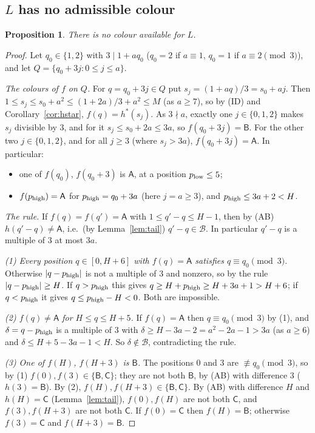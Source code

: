 \documentclass[11pt]{amsart}
\newtheorem{proposition}[theorem]{Proposition}
\theoremstyle{definition}
\theoremstyle{remark}
\newcommand{\cA}{\mathsf{A}}\newcommand{\cB}{\mathsf{B}}\newcommand{\cC}{\mathsf{C}}
\newcommand{\Bset}{\mathcal B}
\begin{document}
\subsection{$L$ has no admissible colour}
\begin{proposition}\label{prop:L}
There is no colour available for $L$.
\end{proposition}
\begin{proof}
Let $q_0\in\{1,2\}$ with $3\mid1+aq_0$ ($q_0=2$ if $a\equiv1$, $q_0=1$ if $a\equiv2\pmod 3$), and let
$Q=\{q_0+3j:0\le j\le a\}$.

\emph{The colours of $f$ on $Q$.} For $q=q_0+3j\in Q$ put $s_j=(1+aq)/3=s_0+aj$. Then $1\le s_j\le s_0+a^2\le
(1+2a)/3+a^2\le M$ (as $a\ge7$), so by (ID) and Corollary~\ref{cor:hstar}, $f(q)=h^\ast(s_j)$. As $3\nmid a$, exactly
one $j\in\{0,1,2\}$ makes $s_j$ divisible by $3$, and for it $s_j\le s_0+2a\le3a$, so $f(q_0+3j)=\cB$. For the other
two $j\in\{0,1,2\}$, and for all $j\ge3$ (where $s_j>3a$), $f(q_0+3j)=\cA$. In particular:
\begin{itemize}
\item one of $f(q_0)$, $f(q_0+3)$ is $\cA$, at a position $p_{\rm low}\le5$;
\item $f(p_{\rm high})=\cA$ for $p_{\rm high}=q_0+3a$ (here $j=a\ge3$), and $p_{\rm high}\le 3a+2<H$.
\end{itemize}

\emph{The rule.} If $f(q)=f(q')=\cA$ with $1\le q'-q\le H-1$, then by (AB) $h(q'-q)\ne\cA$, i.e.\ (by
Lemma~\ref{lem:tail}) $q'-q\in\Bset$. In particular $q'-q$ is a multiple of $3$ at most $3a$.

\emph{(1) Every position $q\in[0,H+6]$ with $f(q)=\cA$ satisfies $q\equiv q_0\pmod 3$.} Otherwise $|q-p_{\rm high}|$
is not a multiple of $3$ and nonzero, so by the rule $|q-p_{\rm high}|\ge H$. If $q>p_{\rm high}$ this gives
$q\ge H+p_{\rm high}\ge H+3a+1>H+6$; if $q<p_{\rm high}$ it gives $q\le p_{\rm high}-H<0$. Both are impossible.

\emph{(2) $f(q)\ne\cA$ for $H\le q\le H+5$.} If $f(q)=\cA$ then $q\equiv q_0\pmod3$ by (1), and $\delta=q-p_{\rm
high}$ is a multiple of $3$ with $\delta\ge H-3a-2=a^2-2a-1>3a$ (as $a\ge6$) and $\delta\le H+5-3a-1<H$. So $\delta\notin\Bset$,
contradicting the rule.

\emph{(3) One of $f(H)$, $f(H+3)$ is $\cB$.} The positions $0$ and $3$ are $\not\equiv q_0\pmod 3$, so by (1)
$f(0),f(3)\in\{\cB,\cC\}$; they are not both $\cB$, by (AB) with difference $3$ ($h(3)=\cB$). By (2),
$f(H),f(H+3)\in\{\cB,\cC\}$. By (AB) with difference $H$ and $h(H)=\cC$ (Lemma~\ref{lem:tail}), $f(0),f(H)$ are not
both $\cC$, and $f(3),f(H+3)$ are not both $\cC$. If $f(0)=\cC$ then $f(H)=\cB$; otherwise $f(3)=\cC$ and
$f(H+3)=\cB$.


\end{proof}
\end{document}
